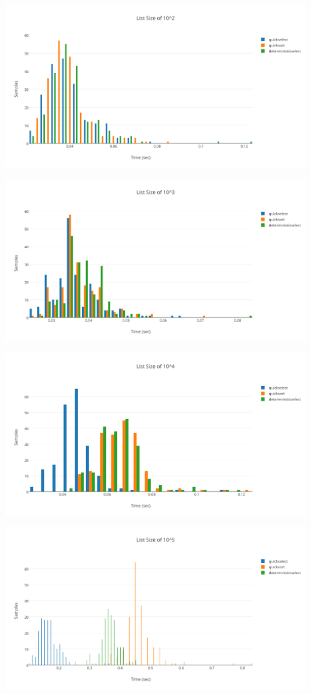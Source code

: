 \documentclass{article}
\begin{document}
\includegraphics[scale=0.62]{list10^2}

\includegraphics[scale=0.62]{list10^3}

\includegraphics[scale=0.62]{list10^4}

\includegraphics[scale=0.62]{list10^5}
\end{document}
